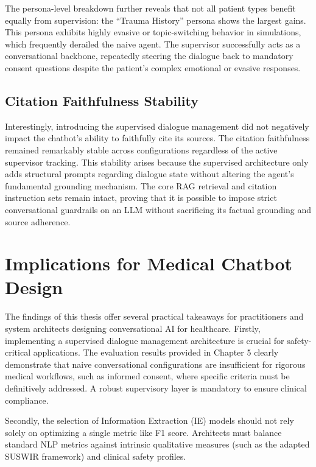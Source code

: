 The persona-level breakdown further reveals that not all patient types benefit equally from supervision: the ``Trauma History'' persona shows the largest gains.
This persona exhibits highly evasive or topic-switching behavior in simulations, which frequently derailed the naive agent. 
The supervisor successfully acts as a conversational backbone, repeatedly steering the dialogue back to mandatory consent questions despite the patient's complex emotional or evasive responses.

\subsection{Citation Faithfulness Stability}

Interestingly, introducing the supervised dialogue management did not negatively impact the chatbot's ability to faithfully cite its sources. 
The citation faithfulness remained remarkably stable across configurations regardless of the active supervisor tracking.
This stability arises because the supervised architecture only adds structural prompts regarding dialogue state without altering the agent's fundamental grounding mechanism. 
The core RAG retrieval and citation instruction sets remain intact, proving that it is possible to impose strict conversational guardrails on an LLM without sacrificing its factual grounding and source adherence.

\section{Implications for Medical Chatbot Design}

The findings of this thesis offer several practical takeaways for practitioners and system architects designing conversational AI for healthcare. 
Firstly, implementing a supervised dialogue management architecture is crucial for safety-critical applications. 
The evaluation results provided in Chapter 5 clearly demonstrate that naive conversational configurations are insufficient for rigorous medical workflows, such as informed consent, where specific criteria must be definitively addressed. 
A robust supervisory layer is mandatory to ensure clinical compliance.

Secondly, the selection of Information Extraction (IE) models should not rely solely on optimizing a single metric like F1 score. 
Architects must balance standard NLP metrics against intrinsic qualitative measures (such as the adapted SUSWIR framework) and clinical safety profiles. 

